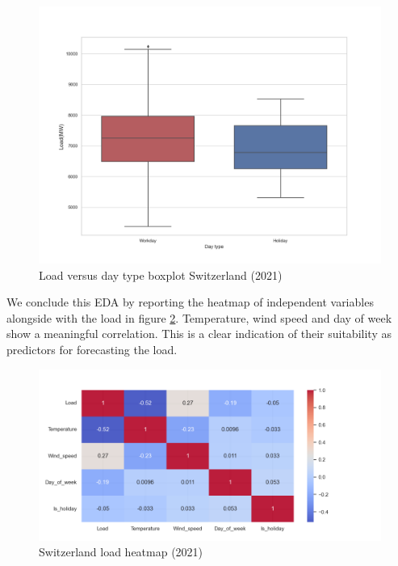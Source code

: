 \begin{figure}[!h]
    \includegraphics[width=\textwidth]{images/CH_is_holiday_boxplot_2021.png}
    \caption{Load versus day type boxplot Switzerland (2021)}
    \label{fig:CH_is_holiday_boxplot_2021}
\end{figure}

We conclude this EDA by reporting the heatmap of independent variables alongside with the load in figure \ref{fig:CH_heatmap_2021}. Temperature, wind speed and day of week show a meaningful correlation. This is a clear indication of their suitability as predictors for forecasting the load.

\begin{figure}[!h]
    \includegraphics[width=\textwidth]{images/CH_heatmap_2021.png}
    \caption{Switzerland load heatmap (2021)}
    \label{fig:CH_heatmap_2021}
\end{figure}